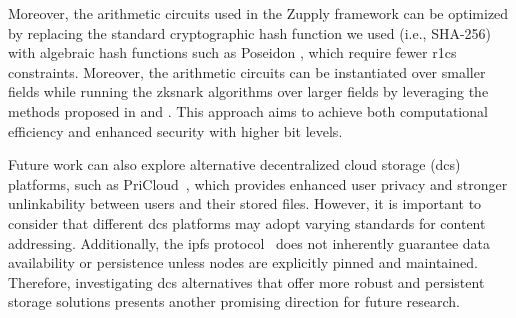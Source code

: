 Moreover, the arithmetic circuits used in the Zupply framework can be optimized by replacing the standard cryptographic hash function we used (i.e., SHA-256) with algebraic hash functions such as Poseidon \cite{Grassi2021Poseidon}, which require fewer \gls{r1cs} constraints. Moreover, the arithmetic circuits can be instantiated over smaller fields while running the \gls{zksnark} algorithms over larger fields by leveraging the methods proposed in \cite{Diamond2023Towers} and \cite{Gong2024}. This approach aims to achieve both computational efficiency and enhanced security with higher bit levels.


Future work can also explore alternative decentralized cloud storage (\gls{dcs}) platforms, such as PriCloud~\cite{Kopp2021PriCloud}, which provides enhanced user privacy and stronger unlinkability between users and their stored files. However, it is important to consider that different \gls{dcs} platforms may adopt varying standards for content addressing. Additionally, the \gls{ipfs} protocol~\cite{Benet2014} does not inherently guarantee data availability or persistence unless nodes are explicitly pinned and maintained. Therefore, investigating \gls{dcs} alternatives that offer more robust and persistent storage solutions presents another promising direction for future research.
